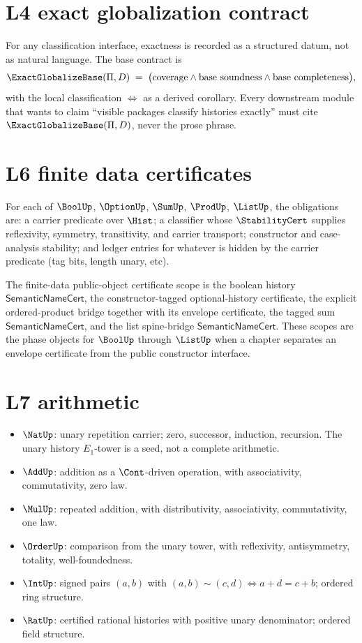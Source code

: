 \section{L4 exact globalization contract}
\label{sec:roadmap-l4-exact-globalization}

For any classification interface, exactness is recorded as a structured datum, not as natural language. The base contract is
$$
\ExactGlobalizeBase(\Pi,D)
\;=\;
\bigl(\text{coverage} \wedge \text{base soundness} \wedge \text{base completeness}\bigr),
$$
with the local classification $\iff$ as a derived corollary. Every downstream module that wants to claim ``visible packages classify histories exactly'' must cite $\ExactGlobalizeBase(\Pi,D)$, never the prose phrase.

\section{L6 finite data certificates}
\label{sec:roadmap-l6-finite-data}

For each of $\BoolUp$, $\OptionUp$, $\SumUp$, $\ProdUp$, $\ListUp$, the obligations are: a carrier predicate over $\Hist$; a classifier whose $\StabilityCert$ supplies reflexivity, symmetry, transitivity, and carrier transport; constructor and case-analysis stability; and ledger entries for whatever is hidden by the carrier predicate (tag bits, length unary, etc).

The finite-data public-object certificate scope is the boolean history $\mathsf{SemanticNameCert}$, the constructor-tagged optional-history certificate, the explicit ordered-product bridge together with its envelope certificate, the tagged sum $\mathsf{SemanticNameCert}$, and the list spine-bridge $\mathsf{SemanticNameCert}$. These scopes are the phase objects for $\BoolUp$ through $\ListUp$ when a chapter separates an envelope certificate from the public constructor interface.

\section{L7 arithmetic}
\label{sec:roadmap-l7-arithmetic}

\begin{itemize}
  \item $\NatUp$: unary repetition carrier; zero, successor, induction, recursion. The unary history $E_1$-tower is a seed, not a complete arithmetic.
  \item $\AddUp$: addition as a $\Cont$-driven operation, with associativity, commutativity, zero law.
  \item $\MulUp$: repeated addition, with distributivity, associativity, commutativity, one law.
  \item $\OrderUp$: comparison from the unary tower, with reflexivity, antisymmetry, totality, well-foundedness.
  \item $\IntUp$: signed pairs $(a,b)$ with $(a,b) \sim (c,d) \iff a+d = c+b$; ordered ring structure.
  \item $\RatUp$: certified rational histories with positive unary denominator; ordered field structure.
\end{itemize}

